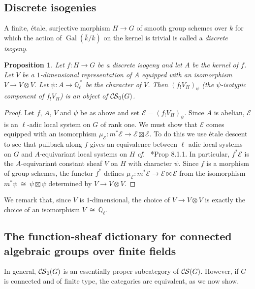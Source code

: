 \documentclass[10pt]{amsart}
\theoremstyle{plain}
\newtheorem{proposition}[theorem]{Proposition}
\theoremstyle{definition}
\theoremstyle{remark}
\newcommand{\EE}{\mathbb{\bar Q}_\ell}
\newcommand{\bFq}{\bar{k}}
\newcommand{\Fq}{k}
\newcommand{\EEx}{\EE^\times}
\DeclareMathOperator{\Gal}{Gal}
\newcommand{\iso}{{\ \cong\ }}
\newcommand{\cs}[1]{{\mathcal{#1}}}
\newcommand{\CS}{{\mathcal{C\hskip-0.8pt S}}}
\newcommand{\bCS}{{\CS_0}}
\begin{document}
\subsection{Discrete isogenies}\label{ssec:discrete_isogenies}

A finite, \'etale, surjective morphism $H\to G$ of smooth group schemes over $\Fq$ for which the action of $\Gal(\bFq/\Fq)$ on the kernel is trivial is called a {\it discrete isogeny}.

\begin{proposition}\label{prop:finite}
Let $f: H \to G$ be a discrete isogeny and let $A$ be the kernel of $f$.
Let $V$ be a $1$-dimensional representation of $A$ 
equipped with an isomorphism $V\to V\otimes V$.
Let $\psi : A \to \EEx$ be the character of $V$.
Then $(f_! V_H)_\psi$ (the $\psi$-isotypic component of $f_!V_H$) is an object of $\bCS(G)$.
\end{proposition}

\begin{proof}
Let $f$, $A$, $V$ and $\psi$ be as above and set $\cs{E} = (f_! V_H)_\psi$.
Since $A$ is abelian, $\cs{E}$ is an $\ell$-adic local system on $G$ of rank one.
We must show that $\cs{E}$ comes equipped with an isomorphism $\mu_\cs{E} : m^* \cs{E} \to \cs{E}\boxtimes\cs{E}$.
To do this we use \'etale descent to see that pullback along $f$ gives an equivalence between $\ell$-adic local systems on $G$ and $A$-equivariant local systems on $H$ {\it cf.\ } \cite{bernstein-luntz:equivariant_sheaves}*{Prop 8.1.1}. 
In particular, $f^*\cs{E}$ is the $A$-equivariant constant sheaf $V$ on $H$ with character $\psi$.
Since $f$ is a morphism of group schemes, the functor $f^*$ defines $\mu_\cs{E} : m^*\cs{E} \to \cs{E}\boxtimes\cs{E}$
from the isomorphism $m^*\psi \iso \psi \boxtimes\psi$ determined by $V\to V\otimes V$.
\end{proof}

We remark that, since $V$ is $1$-dimensional, the choice of $V \to V\otimes V$ is exactly the choice of an isomorphism $V\iso \EE$.

\subsection{The function-sheaf dictionary for connected algebraic groups over finite fields}\label{ssec:connected}

In general, $\bCS(G)$ is an essentially
proper subcategory of $\CS(G)$. 
However, if $G$ is connected and of finite type, the categories are equivalent, as we now show.
\end{document}

